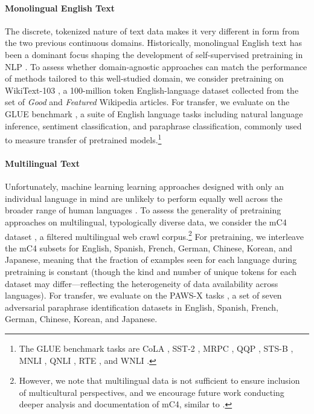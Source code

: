 \documentclass{article}
\begin{document}
\paragraph{Monolingual English Text} The discrete, tokenized nature of text data makes it very different in form from the two previous continuous domains. Historically, monolingual English text has been a dominant focus shaping the development of self-supervised pretraining in NLP \citep{Dai2015SemisupervisedSL, Howard2018UniversalLM, Peters2018DeepCW, Radford2018ImprovingLU, Devlin2019BERTPO, Brown2020LanguageMA}. To assess whether domain-agnostic approaches can match the performance of methods tailored to this well-studied domain, we consider pretraining on WikiText-103 \citep{Merity2017PointerSM}, a 100-million token English-language dataset collected from the set of \textit{Good} and \textit{Featured} Wikipedia articles. For transfer, we evaluate on the GLUE benchmark \citep{Wang2018GLUEAM}, a suite of English language tasks including natural language inference, sentiment classification, and paraphrase classification, commonly used to measure transfer of pretrained models.\footnote{The GLUE benchmark tasks are CoLA \citep{warstadt2018neural}, SST-2 \citep{Socher2013RecursiveDM}, MRPC \citep{Dolan2005AutomaticallyCA}, QQP \citep{WinNT}, STS-B \citep{cer2017semeval}, MNLI \citep{N18-1101, bowman2015large}, QNLI \citep{rajpurkar2016squad, Wang2018GLUEAM}, RTE \citep{dagan2005pascal, bar2006second, giampiccolo2007third, bentivogli2009fifth}, and WNLI \citep{levesque2012winograd}.}

\paragraph{Multilingual Text} Unfortunately, machine learning learning approaches designed with only an individual language in mind are unlikely to perform equally well across the broader range of human languages \citep{Bender2009LinguisticallyN, Bender2011OnAA, bender2019rule, ruder2020beyondenglish, Wu2020AreAL, wu2022oolong}. To assess the generality of pretraining approaches on multilingual, typologically diverse data, we consider the mC4 dataset \citep{2019t5}, a filtered multilingual  web crawl corpus.\footnote{However, we note that multilingual data is not sufficient to ensure inclusion of multicultural perspectives, and we encourage future work conducting deeper analysis and documentation of mC4, similar to \citet{Dodge2021DocumentingTE}.} For pretraining, we interleave the mC4 subsets for English, Spanish, French, German, Chinese, Korean, and Japanese, meaning that the fraction of examples seen for each language during pretraining is constant (though the kind and number of unique tokens for each dataset may differ---reflecting the heterogeneity of data availability across languages). For transfer, we evaluate on the PAWS-X tasks \citep{pawsx2019emnlp}, a set of seven adversarial paraphrase identification datasets in English, Spanish, French, German, Chinese, Korean, and Japanese.
\end{document}

